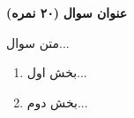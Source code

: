 \Large \textbf{عنوان سوال}
\large \textbf{(۲۰ نمره)}

\normalsize \vspace{0.5cm}
متن سوال...
\begin{enumerate}[label=(\alph*)]
	\item
	بخش اول...
	\item 
	بخش دوم...
\end{enumerate}

